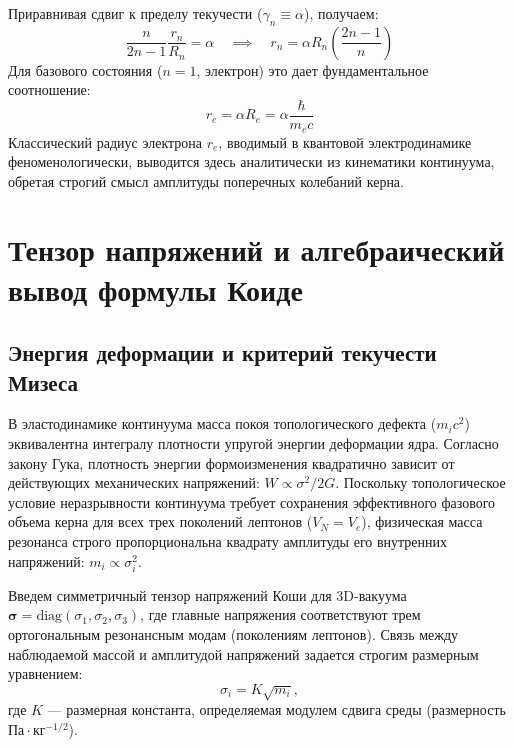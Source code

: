 \documentclass[12pt,a4paper]{article}
\begin{document}
	Приравнивая сдвиг к пределу текучести ($\gamma_n \equiv \alpha$), получаем:
	\begin{equation}
		\frac{n}{2n-1} \frac{r_n}{R_n} = \alpha \quad \implies \quad r_n = \alpha R_n \left( \frac{2n-1}{n} \right)
	\end{equation}
	Для базового состояния ($n=1$, электрон) это дает фундаментальное соотношение:
	\begin{equation}
		r_e = \alpha R_e = \alpha \frac{\hbar}{m_e c}
	\end{equation}
	Классический радиус электрона $r_e$, вводимый в квантовой электродинамике феноменологически, выводится здесь аналитически из кинематики континуума, обретая строгий смысл амплитуды поперечных колебаний керна.
	
	\section{Тензор напряжений и алгебраический вывод формулы Коиде}
	
	\subsection{Энергия деформации и критерий текучести Мизеса}
	В эластодинамике континуума масса покоя топологического дефекта ($m_i c^2$) эквивалентна интегралу плотности упругой энергии деформации ядра. Согласно закону Гука, плотность энергии формоизменения квадратично зависит от действующих механических напряжений: $W \propto \sigma^2 / 2G$.
	Поскольку топологическое условие неразрывности континуума требует сохранения эффективного фазового объема керна для всех трех поколений лептонов ($V_N = V_e$), физическая масса резонанса строго пропорциональна квадрату амплитуды его внутренних напряжений: $m_i \propto \sigma_i^2$.
	
	Введем симметричный тензор напряжений Коши для 3D-вакуума $\boldsymbol{\sigma} = \text{diag}(\sigma_1, \sigma_2, \sigma_3)$, где главные напряжения соответствуют трем ортогональным резонансным модам (поколениям лептонов). Связь между наблюдаемой массой и амплитудой напряжений задается строгим размерным уравнением:
	\begin{equation}
		\sigma_i = K \sqrt{m_i},
	\end{equation}
	где $K$ — размерная константа, определяемая модулем сдвига среды (размерность $\text{Па}\cdot\text{кг}^{-1/2}$).
	
\end{document}
